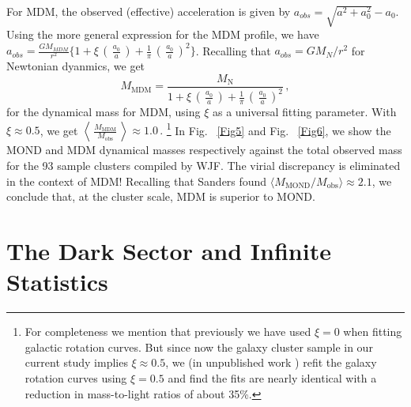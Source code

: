 \documentclass[a4paper]{jpconf}
\begin{document}
For MDM, the observed (effective) acceleration is given by
$a_{obs} = \sqrt{a^2 + a_0^2} - a_0$.  Using
the more general expression for the MDM profile,
we have $a_{obs} = \frac{G M_{MDM}}{r^2} \{ 1 + \xi\,\left(\,
\frac{a_0}{a}\,\right)+ \frac{1}{\pi}\,\left(\,\frac{a_0}{a}\,\right)^2 \}$.
Recalling that $a_{obs} = G M_N / r^2$ for Newtonian dyanmics, we get
\begin{equation}
M_{\textrm{MDM}} = \frac{M_\textrm{N}}{1 + \xi\,
\left(\,\frac{a_0}{a}\,\right)+ 
\frac{1}{\pi}\,\left(\,\frac{a_0}{a}\,\right)^2}\,,
\end{equation}
for the dynamical mass for MDM, using $\xi$ as a universal fitting parameter.
With $\xi \approx 0.5$, we get
$
\left \langle \, \frac{M_\textrm{MDM}}{ M_{\textrm{obs} }} \,\right \rangle
\approx 1.0\,.$
\footnote{
For completeness we mention that previously we
have used $\xi = 0$ when fitting galactic rotation curves.
But since now
the galaxy cluster sample in our current study implies $\xi \approx 0.5$, we
(in unpublished work \cite{Edm1})
refit the galaxy rotation curves using $\xi = 0.5$ and find the fits are 
nearly
identical with a reduction in mass-to-light ratios of about 35\%.
}
In Fig. ~\ref{Fig5} and Fig. ~\ref{Fig6}, we show the MOND and MDM 
dynamical masses respectively
against the total observed mass for the 93 sample clusters compiled by
WJF.
The virial discrepancy is eliminated in the context of MDM! Recalling 
that Sanders found
$\langle M_{\textrm{MOND}} / M_{\textrm{obs}} \rangle \approx 2.1$,
we conclude that, at the cluster 
scale, MDM is superior to MOND.\\

%

\section{\bf {The Dark Sector and Infinite Statistics}}
\end{document}
